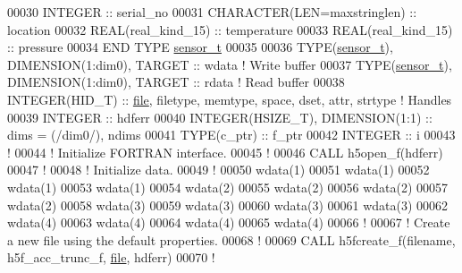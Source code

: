 \begin{DoxyCode}
00030      \textcolor{keywordtype}{INTEGER} :: serial\_no
00031      \textcolor{keywordtype}{CHARACTER(LEN=maxstringlen)} :: location
00032      \textcolor{keywordtype}{REAL(real\_kind\_15)} :: temperature
00033      \textcolor{keywordtype}{REAL(real\_kind\_15)} :: pressure
00034 \textcolor{keyword}{  END TYPE }\hyperlink{structsensor__t}{sensor\_t}
00035 
00036   \textcolor{keywordtype}{TYPE}(\hyperlink{structsensor__t}{sensor\_t}), \textcolor{keywordtype}{DIMENSION(1:dim0)}, \textcolor{keywordtype}{TARGET} ::  wdata \textcolor{comment}{! Write buffer}
00037   \textcolor{keywordtype}{TYPE}(\hyperlink{structsensor__t}{sensor\_t}), \textcolor{keywordtype}{DIMENSION(1:dim0)}, \textcolor{keywordtype}{TARGET} ::  rdata \textcolor{comment}{! Read buffer}
00038   \textcolor{keywordtype}{INTEGER(HID\_T)}  :: \hyperlink{structfile}{file}, filetype, memtype, space, dset, attr, strtype \textcolor{comment}{! Handles}
00039   \textcolor{keywordtype}{INTEGER} :: hdferr
00040   \textcolor{keywordtype}{INTEGER(HSIZE\_T)}, \textcolor{keywordtype}{DIMENSION(1:1)}   :: dims = (/dim0/), ndims
00041   \textcolor{keywordtype}{TYPE}(c\_ptr) :: f\_ptr
00042   \textcolor{keywordtype}{INTEGER} :: i
00043   \textcolor{comment}{!}
00044   \textcolor{comment}{! Initialize FORTRAN interface.}
00045   \textcolor{comment}{!}
00046   \textcolor{keyword}{CALL }h5open\_f(hdferr)
00047   \textcolor{comment}{!}
00048   \textcolor{comment}{! Initialize data.}
00049   \textcolor{comment}{!}
00050   wdata(1)%
00051   wdata(1)%
00052   wdata(1)%
00053   wdata(1)%
00054   wdata(2)%
00055   wdata(2)%
00056   wdata(2)%
00057   wdata(2)%
00058   wdata(3)%
00059   wdata(3)%
00060   wdata(3)%
00061   wdata(3)%
00062   wdata(4)%
00063   wdata(4)%
00064   wdata(4)%
00065   wdata(4)%
00066   \textcolor{comment}{!}
00067   \textcolor{comment}{! Create a new file using the default properties.}
00068   \textcolor{comment}{!}
00069   \textcolor{keyword}{CALL }h5fcreate\_f(filename, h5f\_acc\_trunc\_f, \hyperlink{structfile}{file}, hdferr)
00070   \textcolor{comment}{!}

\end{DoxyCode}
